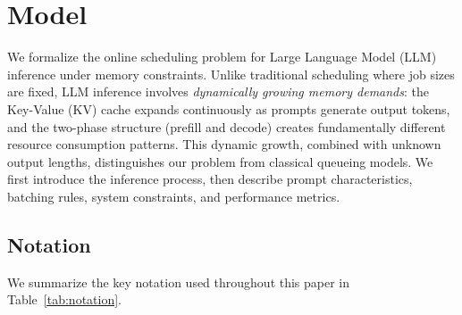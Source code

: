 \section{Model}
\label{sec:model}

We formalize the online scheduling problem for Large Language Model (LLM) inference under memory constraints. Unlike traditional scheduling where job sizes are fixed, LLM inference involves \textit{dynamically growing memory demands}: the Key-Value (KV) cache expands continuously as prompts generate output tokens, and the two-phase structure (prefill and decode) creates fundamentally different resource consumption patterns. This dynamic growth, combined with unknown output lengths, distinguishes our problem from classical queueing models. We first introduce the inference process, then describe prompt characteristics, batching rules, system constraints, and performance metrics.

\subsection{Notation}
\label{subsec:notation}
We summarize the key notation used throughout this paper in Table~\ref{tab:notation}.


